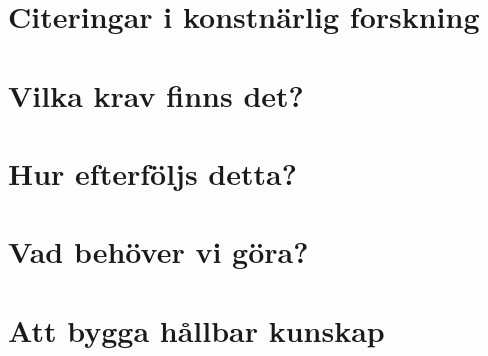 \documentclass{beamer}
\begin{document}
\section{Citeringar i konstnärlig forskning}


\section{Vilka krav finns det?}
\frame{}

\section{Hur efterföljs detta?}
\frame{}

\section{Vad behöver vi göra?}
\frame{}

\section{Att bygga hållbar kunskap}
\frame{}
\end{document}

